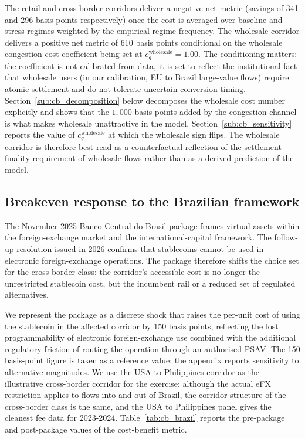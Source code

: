 The retail and cross-border corridors deliver a negative net metric (savings of 341 and 296 basis points respectively) once the cost is averaged over baseline and stress regimes weighted by the empirical regime frequency. The wholesale corridor delivers a positive net metric of 610 basis points conditional on the wholesale congestion-cost coefficient being set at $c_q^{\text{wholesale}} = 1.00$. The conditioning matters: the coefficient is not calibrated from data, it is set to reflect the institutional fact that wholesale users (in our calibration, EU to Brazil large-value flows) require atomic settlement and do not tolerate uncertain conversion timing. Section~\ref{sub:cb_decomposition} below decomposes the wholesale cost number explicitly and shows that the $1{,}000$ basis points added by the congestion channel is what makes wholesale unattractive in the model. Section~\ref{sub:cb_sensitivity} reports the value of $c_q^{\text{wholesale}}$ at which the wholesale sign flips. The wholesale corridor is therefore best read as a counterfactual reflection of the settlement-finality requirement of wholesale flows rather than as a derived prediction of the model.

\subsection{Breakeven response to the Brazilian framework}\label{sub:cb_brazil}

The November 2025 Banco Central do Brasil package frames virtual assets within the foreign-exchange market and the international-capital framework. The follow-up resolution issued in 2026 confirms that stablecoins cannot be used in electronic foreign-exchange operations. The package therefore shifts the choice set for the cross-border class: the corridor's accessible cost is no longer the unrestricted stablecoin cost, but the incumbent rail or a reduced set of regulated alternatives.

We represent the package as a discrete shock that raises the per-unit cost of using the stablecoin in the affected corridor by 150 basis points, reflecting the lost programmability of electronic foreign-exchange use combined with the additional regulatory friction of routing the operation through an authorised PSAV. The 150 basis-point figure is taken as a reference value; the appendix reports sensitivity to alternative magnitudes. We use the USA to Philippines corridor as the illustrative cross-border corridor for the exercise: although the actual eFX restriction applies to flows into and out of Brazil, the corridor structure of the cross-border class is the same, and the USA to Philippines panel gives the cleanest fee data for 2023-2024. Table~\ref{tab:cb_brazil} reports the pre-package and post-package values of the cost-benefit metric.

